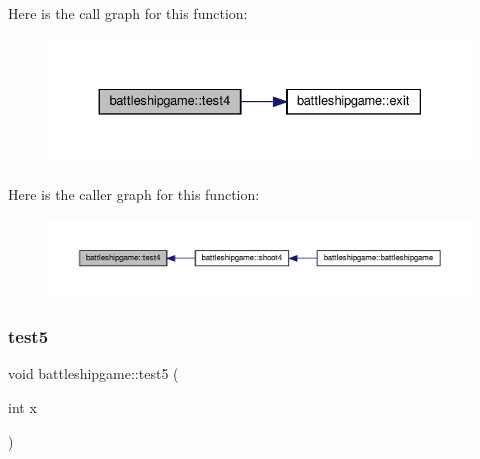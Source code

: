 Here is the call graph for this function\+:
\nopagebreak
\begin{figure}[H]
\begin{center}
\leavevmode
\includegraphics[width=330pt]{classbattleshipgame_a9176cadc06e920eb0aba9679f49e96ca_cgraph}
\end{center}
\end{figure}
Here is the caller graph for this function\+:
\nopagebreak
\begin{figure}[H]
\begin{center}
\leavevmode
\includegraphics[width=350pt]{classbattleshipgame_a9176cadc06e920eb0aba9679f49e96ca_icgraph}
\end{center}
\end{figure}
\mbox{\label{classbattleshipgame_a0119d4f5935bdd98a5a974a4aa8bd5d0}} 
\subsubsection{\texorpdfstring{test5}{test5}}
{\footnotesize\ttfamily void battleshipgame\+::test5 (\begin{DoxyParamCaption}\item[{int}]{x }\end{DoxyParamCaption})\hspace{0.3cm}{\ttfamily [slot]}}

